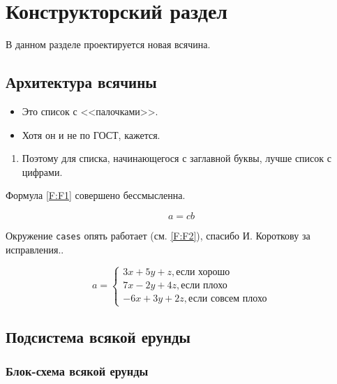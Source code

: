 \documentclass[utf8]{G7-32} %
\begin{document}
\chapter{Конструкторский раздел}

В данном разделе проектируется новая всячина.

\section{Архитектура всячины}


\begin{itemize}
\item Это список с <<палочками>>.
\item Хотя он и не по ГОСТ, кажется.
\end{itemize}

\begin{enumerate}
\item Поэтому для списка, начинающегося с заглавной буквы, лучше список с цифрами.
\end{enumerate}

Формула \ref{F:F1} совершено бессмысленна.


\begin{equation}
a= cb
\label{F:F1}
\end{equation}


Окружение \texttt{cases} опять работает (см. \ref{F:F2}), спасибо И. Короткову за исправления..


\begin{equation}
a= \begin{cases}
 3x + 5y + z, \mbox{если хорошо} \\
 7x - 2y + 4z, \mbox{если плохо}\\
 -6x + 3y + 2z, \mbox{если совсем плохо}
\end{cases}
\label{F:F2}
\end{equation}

\section{Подсистема всякой ерунды}

\subsection{Блок-схема всякой ерунды}
\end{document}
